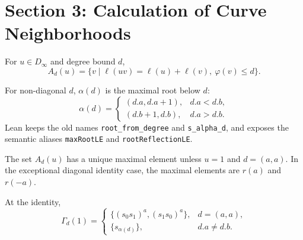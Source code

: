 \chapter{Section 3: Calculation of Curve Neighborhoods}

\begin{definition}\label{ad_def}
  \leanok
  For $u\in D_\infty$ and degree bound $d$,
  \[
    A_d(u)=\{v\mid \ell(uv)=\ell(u)+\ell(v),\ \varphi(v)\le d\}.
  \]
\end{definition}

\begin{definition}\label{max_root_le_def}
  \leanok
  For non-diagonal $d$, $\alpha(d)$ is the maximal root below $d$:
  \[
    \alpha(d)=
    \begin{cases}
      (d.a,d.a+1), & d.a<d.b,\\
      (d.b+1,d.b), & d.a>d.b.
    \end{cases}
  \]
  Lean keeps the old names \texttt{root\_from\_degree} and \texttt{s\_alpha\_d},
  and exposes the semantic aliases \texttt{maxRootLE} and
  \texttt{rootReflectionLE}.
\end{definition}

\begin{lemma}\label{lemma_3_1}
  \leanok
  The set $A_d(u)$ has a unique maximal element unless $u=1$ and $d=(a,a)$.
  In the exceptional diagonal identity case, the maximal elements are
  $r(a)$ and $r(-a)$.
\end{lemma}

\begin{theorem}\label{formula_3_identity}
  \leanok
  At the identity,
  \[
    \Gamma_d(1)=
    \begin{cases}
      \{(s_0s_1)^a,(s_1s_0)^a\}, & d=(a,a),\\
      \{s_{\alpha(d)}\}, & d.a\ne d.b.
    \end{cases}
  \]
\end{theorem}

